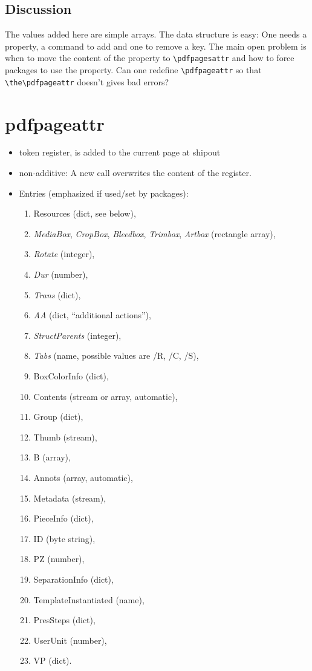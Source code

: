 \documentclass{article}
\begin{document}
\subsection{Discussion}

The values added here are simple arrays. The data structure is easy: One needs a property, a command to add and one to remove a key. The main open problem is when to move the content of the property to \verb`\pdfpagesattr` and how to force packages to use the property. Can one redefine \verb+\pdfpageattr+ so that \verb+\the\pdfpageattr+ doesn't gives bad errors?


\section{pdfpageattr}
\begin{itemize}
\item token register, is added to the current page at shipout
\item non-additive: A new call overwrites the content of the register.
\item Entries (emphasized if used/set by packages):
   \begin{enumerate}
    \item Resources (dict, see below),
    \item \emph{MediaBox}, \emph{CropBox}, \emph{Bleedbox}, \emph{Trimbox}, \emph{Artbox} (rectangle array),
    \item \emph{Rotate} (integer),
    \item \emph{Dur} (number),
    \item \emph{Trans} (dict),
    \item \emph{AA} (dict, \enquote{additional actions}),
    \item \emph{StructParents} (integer),
    \item \emph{Tabs} (name, possible values are /R, /C, /S),
    \item BoxColorInfo (dict),
    \item Contents (stream or array, automatic),
    \item Group (dict),
    \item Thumb (stream),
    \item B (array),
    \item Annots (array, automatic),
    \item Metadata (stream),
    \item PieceInfo (dict),
    \item ID (byte string),
    \item PZ (number),
    \item SeparationInfo (dict),
    \item TemplateInstantiated (name),
    \item  PresSteps (dict),
    \item UserUnit (number),
    \item VP (dict).
    \end{enumerate}
   \end{itemize}
\end{document}
